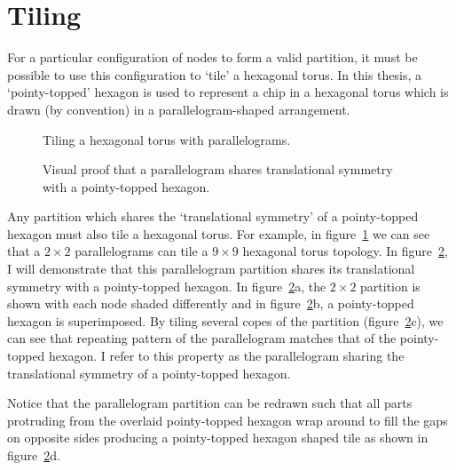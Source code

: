	\section{Tiling}
		
		For a particular configuration of nodes to form a valid partition, it must
		be possible to use this configuration to `tile' a hexagonal torus. In this
		thesis, a `pointy-topped' hexagon is used to represent a chip in a
		hexagonal torus which is drawn (by convention) in a parallelogram-shaped
		arrangement.
		
		\begin{figure}
			\center
			
			\caption{Tiling a hexagonal torus with parallelograms.}
			\label{fig:tiling-a-torus}
		 \end{figure}
		 
		 \begin{figure}
			\center
			
			\caption[A parallelogram tiles a hexagonal torus.]%
			{Visual proof that a parallelogram shares translational symmetry
			with a pointy-topped hexagon.}
			\label{fig:parallelogram-tiling}
		\end{figure}
		
		Any partition which shares the `translational symmetry' of a pointy-topped
		hexagon must also tile a hexagonal torus. For example, in
		figure~\ref{fig:tiling-a-torus} we can see that a $2\times2$ parallelograms
		can tile a $9\times9$ hexagonal torus topology.  In
		figure~\ref{fig:parallelogram-tiling}, I will demonstrate that this
		parallelogram partition shares its translational symmetry with a
		pointy-topped hexagon. In figure~\ref{fig:parallelogram-tiling}a, the
		$2\times2$ partition is shown with each node shaded differently and in
		figure~\ref{fig:parallelogram-tiling}b, a pointy-topped hexagon is
		superimposed. By tiling several copes of the partition
		(figure~\ref{fig:parallelogram-tiling}c), we can see that repeating pattern
		of the parallelogram matches that of the pointy-topped hexagon. I refer to
		this property as the parallelogram sharing the translational symmetry of a
		pointy-topped hexagon.
		
		Notice that the parallelogram partition can be redrawn such that all parts
		protruding from the overlaid pointy-topped hexagon wrap around to fill the
		gaps on opposite sides producing a pointy-topped hexagon shaped tile as
		shown in figure~\ref{fig:parallelogram-tiling}d.
		
